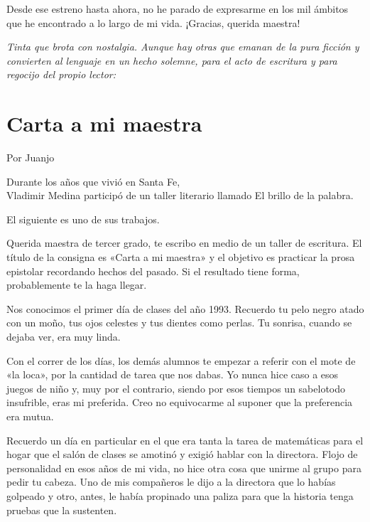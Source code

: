 \documentclass[11pt,twoside,openright,a5paper]{book}
\begin{document}
Desde ese estreno hasta ahora, no he parado de expresarme en los mil ámbitos que he
encontrado a lo largo de mi vida. ¡Gracias, querida maestra!

\vspace{0.5cm}
\emph{Tinta que brota con nostalgia. Aunque hay otras que emanan de la pura ficción y convierten al lenguaje en un hecho solemne, para el acto de escritura y para regocijo del propio lector:}

\section*{Carta a mi maestra}

\begin{flushright}Por Juanjo\end{flushright}

\begin{flushright}
Durante los años que vivió en Santa Fe,\\
Vladimir Medina participó de un taller literario llamado El brillo de la palabra.

El siguiente es uno de sus trabajos.
\end{flushright}

Querida maestra de tercer grado, te escribo en medio de un taller de escritura. El título de la consigna es «Carta a mi maestra» y el objetivo es practicar la prosa epistolar recordando hechos del pasado. Si el resultado tiene forma, probablemente te la haga llegar.

Nos conocimos el primer día de clases del año 1993. Recuerdo tu pelo negro atado con un moño, tus ojos celestes y tus dientes como perlas. Tu sonrisa, cuando se dejaba ver, era muy linda.

Con el correr de los días, los demás alumnos te empezar a referir con el mote de «la loca»,  por la cantidad de tarea que nos dabas. Yo nunca hice caso a esos juegos de niño y, muy por el contrario, siendo por esos tiempos un sabelotodo insufrible, eras mi preferida. Creo no equivocarme al suponer que la preferencia era mutua.

Recuerdo un día en particular en el que era tanta la tarea de matemáticas para el hogar que el salón de clases se amotinó y exigió hablar con la directora. Flojo de personalidad en esos años de mi vida, no hice otra cosa que unirme al grupo para pedir tu cabeza. Uno de mis compañeros le dijo a la directora que lo habías golpeado y otro, antes, le había propinado una paliza para que la historia tenga pruebas que la sustenten. 
\end{document}
